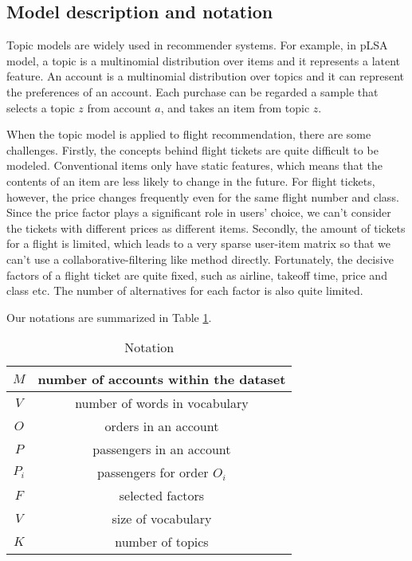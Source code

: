 \documentclass{llncs}
\begin{document}
\subsection{Model description and notation}
Topic models are widely used in recommender systems. For example, in pLSA model\cite{tomas:coll}, a topic is a multinomial distribution over items and it represents a latent feature. An account is a multinomial distribution over topics and it can represent the preferences of an account. Each purchase can be regarded a sample that selects a topic $z$ from account $a$, and takes an item from topic $z$.\par
When the topic model is applied to flight recommendation, there are some challenges. Firstly, the concepts behind flight tickets are quite difficult to be modeled. Conventional items only have static features, which means that the contents of an item are less likely to change in the future. For flight tickets, however, the price changes frequently even for the same flight number and class. Since the price factor plays a significant role in users' choice, we can't consider the tickets with different prices as different items. Secondly, the amount of tickets for a flight is limited, which leads to a very sparse user-item matrix so that we can't use a collaborative-filtering like method directly. Fortunately, the decisive factors of a flight ticket are quite fixed, such as airline, takeoff time, price and class etc. The number of alternatives for each factor is also quite limited.\par
Our notations are summarized in Table \ref{tab:not}.\par
\begin{table}[!htbp]
\centering
\caption{\label{tab:not}Notation}
\begin{tabular}{|c|c|} \hline
$M$ & number of accounts within the dataset\\ \hline
$V$ & number of words in vocabulary\\ \hline
$O$ & orders in an account\\ \hline
$P$ & passengers in an account\\ \hline
$P_i$ & passengers for order $O_i$ \\ \hline
$F$ & selected factors\\ \hline
$V$ & size of vocabulary\\ \hline
$K$ & number of topics\\ \hline
\end{tabular}
\end{table}
\end{document}
